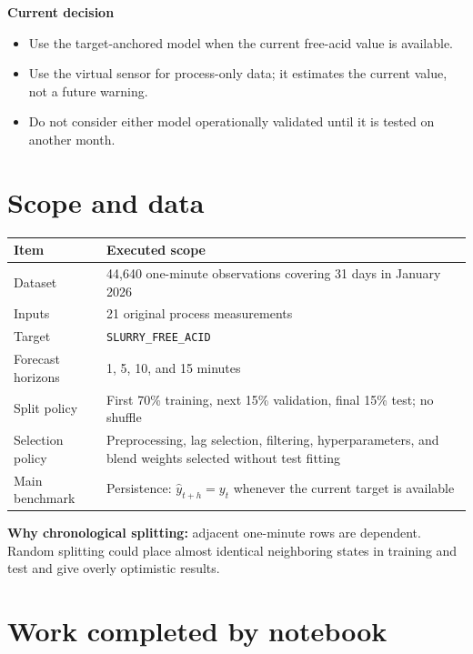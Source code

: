 \documentclass[10pt,a4paper]{article}
\begin{document}
\textbf{Current decision}
\begin{itemize}
  \item Use the target-anchored model when the current free-acid value is available.
  \item Use the virtual sensor for process-only data; it estimates the current value, not a future warning.
  \item Do not consider either model operationally validated until it is tested on another month.
\end{itemize}

\section{Scope and data}

\begin{tabularx}{\textwidth}{L{0.28\textwidth}Y}
\toprule
\textbf{Item} & \textbf{Executed scope} \\
\midrule
Dataset & 44,640 one-minute observations covering 31 days in January 2026 \\
Inputs & 21 original process measurements \\
Target & \texttt{SLURRY\_FREE\_ACID} \\
Forecast horizons & 1, 5, 10, and 15 minutes \\
Split policy & First 70\% training, next 15\% validation, final 15\% test; no shuffle \\
Selection policy & Preprocessing, lag selection, filtering, hyperparameters, and blend weights selected without test fitting \\
Main benchmark & Persistence: $\hat y_{t+h}=y_t$ whenever the current target is available \\
\bottomrule
\end{tabularx}

\textbf{Why chronological splitting:} adjacent one-minute rows are dependent. Random splitting could place almost identical neighboring states in training and test and give overly optimistic results.

\section{Work completed by notebook}
\end{document}

